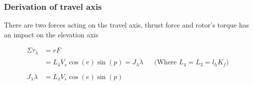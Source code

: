 
\subsubsection{Derivation of travel axis}
There are two forces acting on the travel axis, thrust force and rotor's torque has an impact on the elevation axis

\begin{align} 
\Sigma{\tau}_{\lambda} &=  rF \nonumber\\ 
 &= L_4 V_s \cos(e) \sin(p) =J_\lambda \ddot{\lambda} && \text{(Where $L_4=L_3=l_h K_f$)} \nonumber\\
 \nonumber \\
J_\lambda \ddot{\lambda}&=L_4V_s\cos(e)\sin(p) \label{eq:travel}
\end{align}

 
